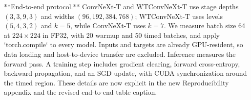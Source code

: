 \documentclass[11pt]{article}
\begin{document}
\begin{markdown}
**End-to-end protocol.** ConvNeXt-T and WTConvNeXt-T use stage depths $(3,3,9,3)$ and widths $(96,192,384,768)$; WTConvNeXt-T uses levels $(5,4,3,2)$ and $k=5$, while ConvNeXt-T uses $k=7$. We measure batch size 64 at $224\times224$ in FP32, with 20 warmup and 50 timed batches, and apply `torch.compile` to every model. Inputs and targets are already GPU-resident, so data loading and host-to-device transfer are excluded. Inference measures the forward pass. A training step includes gradient clearing, forward cross-entropy, backward propagation, and an SGD update, with CUDA synchronization around the timed region. These details are now explicit in the new Reproducibility appendix and the revised end-to-end table caption.

\end{markdown}
\end{document}
